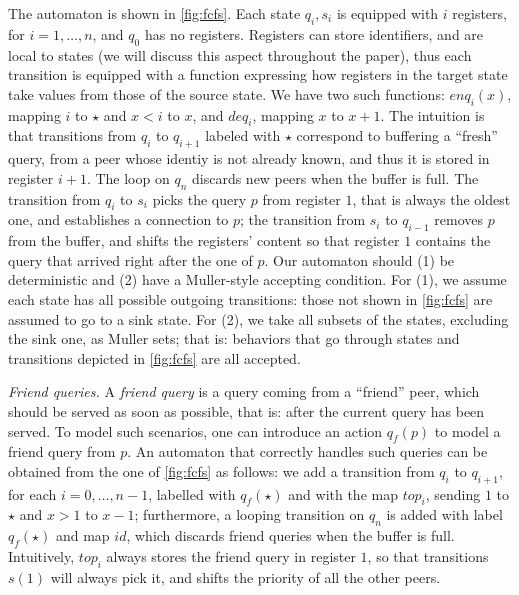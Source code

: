 %
The automaton is shown in \autoref{fig:fcfs}. Each state $q_i,s_i$ is equipped with $i$ registers, for $i=1,\dots,n$, and $q_0$ has no registers. Registers can store identifiers, and are local to states (we will discuss this aspect throughout the paper), thus each transition is equipped with a function expressing how registers in the target state take values from those of the source state. We have two such functions: $enq_i(x)$, mapping $i$ to $\star$ and $x < i$ to $x$, and $deq_i$, mapping $x$ to $x+1$.
%
The intuition is that transitions from $q_i$ to $q_{i+1}$ labeled with $\star$ correspond to buffering a ``fresh'' query, from a peer whose identiy is not already known, and thus it is stored in register $i+1$. The loop on $q_n$ discards new peers when the buffer is full. The transition from $q_i$ to $s_i$ picks the query $p$ from register $1$, that is always the oldest one, and establishes a connection to $p$;
the transition from $s_i$ to $q_{i-1}$ removes $p$ from the buffer, and shifts the registers' content so that register $1$ contains the query that arrived right after the one of $p$. Our automaton should (1) be deterministic and (2) have a Muller-style accepting condition. For (1), we assume each state has all possible outgoing transitions: those not shown in \autoref{fig:fcfs} are assumed to go to a sink state. For (2), we take all subsets of the states, excluding the sink one, as Muller sets; that is: behaviors that go through states and transitions depicted in \autoref{fig:fcfs} are all accepted. 

%

\emph{Friend queries.} A \emph{friend query} is a query coming from a ``friend'' peer, which should be served as soon as possible, that is: after the current query has been served. To model such scenarios, one can introduce an action $q_f(p)$ to model a friend query from $p$. An automaton that correctly handles such queries can be obtained from the one of \autoref{fig:fcfs} as follows: we add a transition from $q_i$ to $q_{i+1}$, for each $i=0,\dots,n-1$, labelled with $q_f(\star)$ and with the map $top_i$, sending $1$ to $\star$ and $x > 1$ to $x-1$; furthermore, a looping transition on $q_n$ is added with label $q_f(\star)$ and map $id$, which discards friend queries when the buffer is full. Intuitively, $top_i$ always stores the friend query in register $1$, so that transitions $s(1)$ will always pick it, and shifts the priority of all the other peers.

